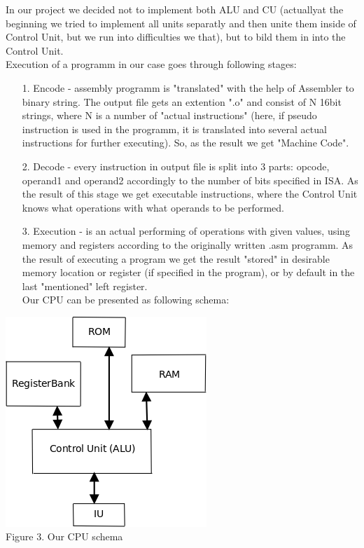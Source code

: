 \documentclass[11pt,a4paper]{article}
\begin{document}
In our project we decided not to implement both ALU and CU (actuallyat the beginning we tried to implement all units separatly and then unite them inside of Control Unit, but we run into difficulties we that), but to bild them in into the Control Unit.\\
Execution of a programm in our case goes through following stages:
\begin{enumerate}
	\item[1.] Encode - assembly programm is "translated" with the help of  Assembler to binary string. The output file gets an extention ".o" and consist of N 16bit strings, where N is a number of "actual instructions" (here, if pseudo instruction is used in the programm, it is translated into several actual instructions for further executing). So, as the result we get "Machine Code".
	\item[2.] Decode - every instruction in output file is split into 3 parts: opcode, operand1 and operand2 accordingly to the number of bits specified in ISA. As the result of this stage we get executable instructions, where the Control Unit knows what operations with what operands to be performed. 
	\item[3.] Execution - is an actual performing of operations with given values, using memory and registers according to the originally written .asm programm. As the result of executing a program we get the result "stored" in desirable memory location or register (if specified in the program), or by default in the last "mentioned" left register.\\
Our CPU can be presented as following schema:
\end{enumerate} 
\begin{center}
\includegraphics[scale=0.6]{pics/ourCPU.png}\\
Figure 3. Our CPU schema
\end{center}
\end{document}
